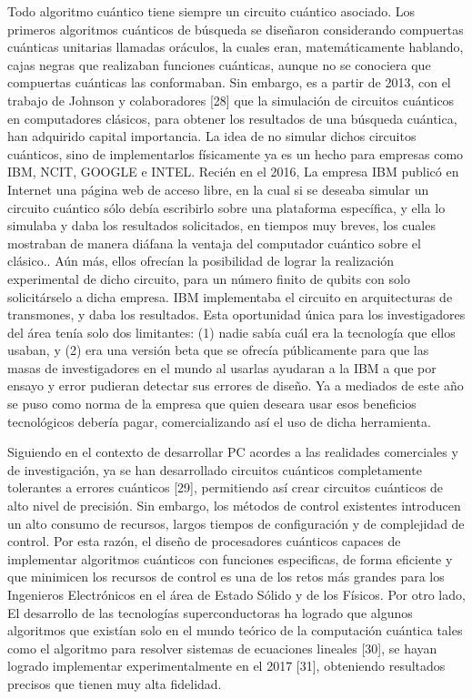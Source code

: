 Todo algoritmo cuántico tiene siempre un circuito cuántico asociado. Los primeros algoritmos cuánticos de búsqueda se diseñaron considerando compuertas cuánticas unitarias llamadas oráculos, la cuales eran, matemáticamente hablando, cajas negras que realizaban funciones cuánticas, aunque no se conociera que compuertas cuánticas las conformaban. Sin embargo, es a partir de 2013, con el trabajo de Johnson y colaboradores [28] que la simulación de circuitos cuánticos en computadores clásicos, para obtener los resultados de una búsqueda cuántica, han adquirido capital importancia. La idea de no simular dichos circuitos cuánticos, sino de implementarlos físicamente ya es un hecho para empresas como IBM, NCIT, GOOGLE e INTEL. Recién en el 2016, La empresa IBM publicó en Internet una página web de acceso libre, en la cual si se deseaba simular un circuito cuántico sólo debía escribirlo sobre una plataforma específica, y ella lo simulaba y daba los resultados solicitados, en tiempos muy breves, los cuales mostraban de manera diáfana la ventaja del computador cuántico sobre el clásico.. Aún más, ellos ofrecían la posibilidad de lograr la realización experimental de dicho circuito, para un número finito de qubits con solo solicitárselo a dicha empresa. IBM implementaba el circuito en arquitecturas de transmones, y daba los resultados. Esta oportunidad única para los investigadores del área tenía solo dos limitantes: (1) nadie sabía cuál era la tecnología que ellos usaban, y (2) era una versión beta que se ofrecía públicamente para que las masas de investigadores en el mundo al usarlas ayudaran a la IBM a que por ensayo y error pudieran detectar sus errores de diseño. Ya a mediados de este año se puso como norma de la empresa que quien deseara usar esos beneficios tecnológicos debería pagar, comercializando así el uso de dicha herramienta.

Siguiendo en el contexto de desarrollar PC acordes a las realidades comerciales y de investigación, ya se han desarrollado circuitos cuánticos completamente tolerantes a errores cuánticos [29], permitiendo así crear circuitos cuánticos de alto nivel de precisión. Sin embargo, los métodos de control existentes introducen un alto consumo de recursos, largos tiempos de configuración y de complejidad de control. Por esta razón, el diseño de procesadores cuánticos capaces de implementar algoritmos cuánticos con funciones especificas, de forma eficiente y que minimicen los recursos de control es una de los retos más grandes para los Ingenieros Electrónicos en el área de Estado Sólido y de los Físicos.  Por otro lado, El desarrollo de las tecnologías superconductoras ha logrado que algunos algoritmos que existían solo en el mundo teórico de la computación cuántica tales como el algoritmo para resolver sistemas de ecuaciones lineales [30], se hayan logrado implementar experimentalmente en el 2017 [31], obteniendo resultados precisos que tienen muy alta fidelidad.


